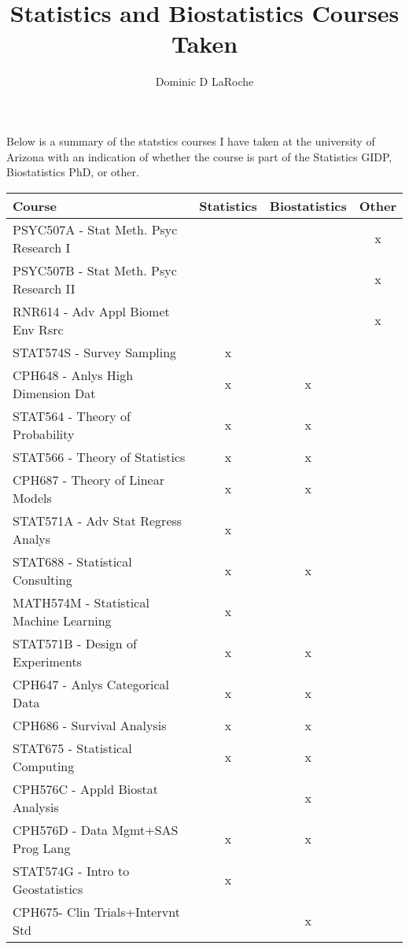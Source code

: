 \documentclass{article}\usepackage[]{graphicx}\usepackage[]{color}
\title{Statistics and Biostatistics Courses Taken}
\author{Dominic D LaRoche}
\begin{document}
\maketitle
Below is a summary of the statstics courses I have taken at the university of Arizona with an indication of whether the course is part of the Statistics GIDP, Biostatistics PhD, or other.\\

\doublespacing
\begin{tabular}{lccc}
Course & Statistics & Biostatistics & Other\\
\hline
PSYC507A - Stat Meth. Psyc Research I & & & x\\
PSYC507B - Stat Meth. Psyc Research II & & & x\\
RNR614 - Adv Appl Biomet Env Rsrc & & & x\\
STAT574S - Survey Sampling & x & & \\
CPH648 - Anlys High Dimension Dat & x & x & \\
STAT564 - Theory of Probability & x & x & \\
STAT566 - Theory of Statistics & x & x & \\
CPH687 - Theory of Linear Models & x & x & \\
STAT571A - Adv Stat Regress Analys & x &  & \\
STAT688 - Statistical Consulting & x & x & \\
MATH574M - Statistical Machine Learning & x &  & \\
STAT571B - Design of Experiments & x & x & \\
CPH647 - Anlys Categorical Data & x & x & \\
CPH686 - Survival Analysis & x & x & \\
STAT675 - Statistical Computing & x & x & \\
CPH576C - Appld Biostat Analysis &  & x & \\
CPH576D - Data Mgmt+SAS Prog Lang & x & x & \\
STAT574G - Intro to Geostatistics & x &  & \\
CPH675- Clin Trials+Intervnt Std &  & x & \\

\hline
\end{tabular}
\end{document}
